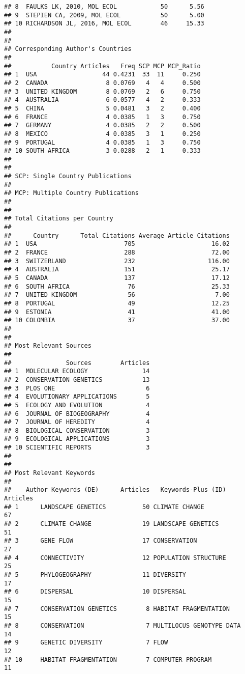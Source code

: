 \documentclass[]{article}
\begin{document}
\begin{verbatim}
## 8  FAULKS LK, 2010, MOL ECOL            50      5.56
## 9  STEPIEN CA, 2009, MOL ECOL           50      5.00
## 10 RICHARDSON JL, 2016, MOL ECOL        46     15.33
## 
## 
## Corresponding Author's Countries
## 
##           Country Articles   Freq SCP MCP MCP_Ratio
## 1  USA                  44 0.4231  33  11     0.250
## 2  CANADA                8 0.0769   4   4     0.500
## 3  UNITED KINGDOM        8 0.0769   2   6     0.750
## 4  AUSTRALIA             6 0.0577   4   2     0.333
## 5  CHINA                 5 0.0481   3   2     0.400
## 6  FRANCE                4 0.0385   1   3     0.750
## 7  GERMANY               4 0.0385   2   2     0.500
## 8  MEXICO                4 0.0385   3   1     0.250
## 9  PORTUGAL              4 0.0385   1   3     0.750
## 10 SOUTH AFRICA          3 0.0288   2   1     0.333
## 
## 
## SCP: Single Country Publications
## 
## MCP: Multiple Country Publications
## 
## 
## Total Citations per Country
## 
##      Country      Total Citations Average Article Citations
## 1  USA                        705                     16.02
## 2  FRANCE                     288                     72.00
## 3  SWITZERLAND                232                    116.00
## 4  AUSTRALIA                  151                     25.17
## 5  CANADA                     137                     17.12
## 6  SOUTH AFRICA                76                     25.33
## 7  UNITED KINGDOM              56                      7.00
## 8  PORTUGAL                    49                     12.25
## 9  ESTONIA                     41                     41.00
## 10 COLOMBIA                    37                     37.00
## 
## 
## Most Relevant Sources
## 
##               Sources        Articles
## 1  MOLECULAR ECOLOGY               14
## 2  CONSERVATION GENETICS           13
## 3  PLOS ONE                         6
## 4  EVOLUTIONARY APPLICATIONS        5
## 5  ECOLOGY AND EVOLUTION            4
## 6  JOURNAL OF BIOGEOGRAPHY          4
## 7  JOURNAL OF HEREDITY              4
## 8  BIOLOGICAL CONSERVATION          3
## 9  ECOLOGICAL APPLICATIONS          3
## 10 SCIENTIFIC REPORTS               3
## 
## 
## Most Relevant Keywords
## 
##    Author Keywords (DE)      Articles   Keywords-Plus (ID)     Articles
## 1      LANDSCAPE GENETICS          50 CLIMATE CHANGE                 67
## 2      CLIMATE CHANGE              19 LANDSCAPE GENETICS             51
## 3      GENE FLOW                   17 CONSERVATION                   27
## 4      CONNECTIVITY                12 POPULATION STRUCTURE           25
## 5      PHYLOGEOGRAPHY              11 DIVERSITY                      17
## 6      DISPERSAL                   10 DISPERSAL                      15
## 7      CONSERVATION GENETICS        8 HABITAT FRAGMENTATION          15
## 8      CONSERVATION                 7 MULTILOCUS GENOTYPE DATA       14
## 9      GENETIC DIVERSITY            7 FLOW                           12
## 10     HABITAT FRAGMENTATION        7 COMPUTER PROGRAM               11
\end{verbatim}
\end{document}
